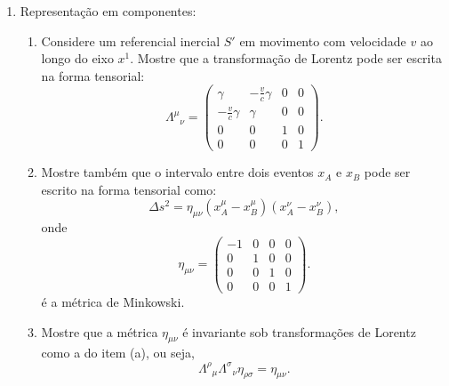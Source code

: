 \begin{enumerate}
      \item Representação em componentes:
            \begin{enumerate}
                  \item Considere um referencial inercial $S'$ em movimento com
                        velocidade $v$ ao longo do eixo $x^1$. Mostre que a
                        transformação de Lorentz pode ser escrita na forma tensorial:
                        $$
                              \Lambda^\mu{}_\nu =
                              \begin{pmatrix}
                                    \gamma             & -\frac{v}{c}\gamma & 0 & 0 \\
                                    -\frac{v}{c}\gamma & \gamma             & 0 & 0 \\
                                    0                  & 0                  & 1 & 0 \\
                                    0                  & 0                  & 0 & 1
                              \end{pmatrix}.
                        $$

                  \item Mostre também que o intervalo entre dois eventos $x_A$ e $x_B$
                        pode ser escrito na forma tensorial como:
                        $$
                              \Delta s^2 = \eta_{\mu\nu} (x_A^\mu - x_B^\mu)(x_A^\nu - x_B^\nu),
                        $$
                        onde
                        $$
                              \eta_{\mu\nu} =
                              \begin{pmatrix}
                                    -1 & 0 & 0 & 0 \\
                                    0  & 1 & 0 & 0 \\
                                    0  & 0 & 1 & 0 \\
                                    0  & 0 & 0 & 1
                              \end{pmatrix}.
                        $$
                        é a métrica de Minkowski.

                  \item Mostre que a métrica $\eta_{\mu\nu}$ é invariante sob
                        transformações de Lorentz como a do item (a), ou seja,
                        $$
                              \Lambda^\rho{}_\mu \Lambda^\sigma{}_\nu \eta_{\rho\sigma} = \eta_{\mu\nu}.
                        $$
            \end{enumerate}


\end{enumerate}
